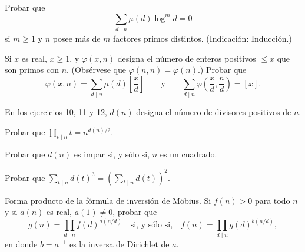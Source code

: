 \documentclass[12pt,a4paper]{book}
\begin{document}
    \begin{ejercicio}
        Probar que
        \begin{equation*}
            \sum_{d\mid n}\mu(d)\log^m d=0
        \end{equation*}
        si $m\geq1$ y $n$ posee más de $m$ factores primos distintos. (Indicación:
        Inducción.)
    \end{ejercicio}

    \begin{ejercicio}
        Si $x$ es real, $x\geq1$, y $\varphi(x,n)$ designa el número de enteros positivos
        $\leq x$ que son primos con $n$. (Obsérvese que $\varphi(n,n)=\varphi(n)$.) Probar
        que
        \begin{equation*}
            \varphi(x,n)=\sum_{d\mid n}\mu(d)\left[\frac{x}{d}\right]\qquad\text{y}\qquad
            \sum_{d\mid n}\varphi\left(\frac{x}{d},\frac{n}{d}\right)=[x].
        \end{equation*}
    \end{ejercicio}

    En los ejercicios 10, 11 y 12, $d(n)$ designa el número de divisores positivos de $n$.

    \begin{ejercicio}
        Probar que $\prod_{t\mid n}t=n^{d(n)/2}$.
    \end{ejercicio}

    \begin{ejercicio}
        Probar que $d(n)$ es impar si, y sólo si, $n$ es un cuadrado.
    \end{ejercicio}

    \begin{ejercicio}
        Probar que $\sum_{t\mid n}d(t)^3=\left(\sum_{t\mid n}d(t)\right)^2$.
    \end{ejercicio}

    \begin{ejercicio}
        Forma producto de la fórmula de inversión de Möbius. Si $f(n)>0$ para todo $n$ y
        si $a(n)$ es real, $a(1)\neq0$, probar que
        \begin{equation*}
            g(n)=\prod_{d\mid n}f(d)^{a(n/d)}\quad\text{si, y sólo si,}\quad
            f(n)=\prod_{d\mid n}g(d)^{b(n/d)},
        \end{equation*}
        en donde $b=a^{-1}$ es la inversa de Dirichlet de $a$.
    \end{ejercicio}
\end{document}
